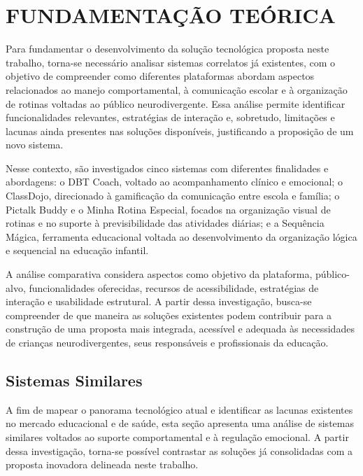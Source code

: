 
\chapter{FUNDAMENTAÇÃO TEÓRICA}
\label{chap:fundamentacao}

Para fundamentar o desenvolvimento da solução tecnológica proposta neste trabalho, torna-se necessário analisar sistemas correlatos já existentes, com o objetivo de compreender como diferentes plataformas abordam aspectos relacionados ao manejo comportamental, à comunicação escolar e à organização de rotinas voltadas ao público neurodivergente. Essa análise permite identificar funcionalidades relevantes, estratégias de interação e, sobretudo, limitações e lacunas ainda presentes nas soluções disponíveis, justificando a proposição de um novo sistema.

Nesse contexto, são investigados cinco sistemas com diferentes finalidades e abordagens: o DBT Coach, voltado ao acompanhamento clínico e emocional; o ClassDojo, direcionado à gamificação da comunicação entre escola e família; o Pictalk Buddy e o Minha Rotina Especial, focados na organização visual de rotinas e no suporte à previsibilidade das atividades diárias; e a Sequência Mágica, ferramenta educacional voltada ao desenvolvimento da organização lógica e sequencial na educação infantil.

A análise comparativa considera aspectos como objetivo da plataforma, público-alvo, funcionalidades oferecidas, recursos de acessibilidade, estratégias de interação e usabilidade estrutural. A partir dessa investigação, busca-se compreender de que maneira as soluções existentes podem contribuir para a construção de uma proposta mais integrada, acessível e adequada às necessidades de crianças neurodivergentes, seus responsáveis e profissionais da educação.

\section{Sistemas Similares}

A fim de mapear o panorama tecnológico atual e identificar as lacunas existentes no mercado educacional e de saúde, esta seção apresenta uma análise de sistemas similares voltados ao suporte comportamental e à regulação emocional. A partir dessa investigação, torna-se possível contrastar as soluções já consolidadas com a proposta inovadora delineada neste trabalho.

